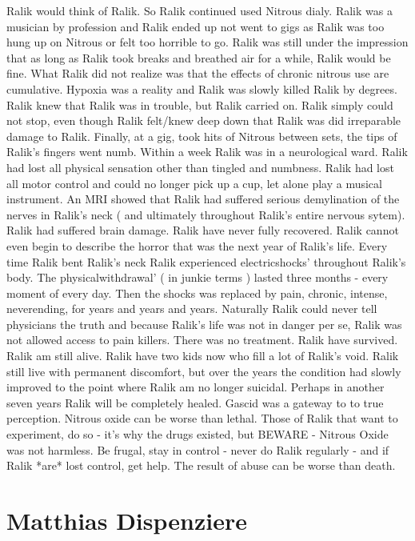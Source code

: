 \documentclass[12pt]{book}
\begin{document}
Ralik would think of Ralik. So Ralik continued used Nitrous dialy. Ralik was a musician by profession and Ralik ended up not went to gigs as Ralik was too hung up on Nitrous or felt too horrible to go. Ralik was still under the impression that as long as Ralik took breaks and breathed air for a while, Ralik would be fine. What Ralik did not realize was that the effects of chronic nitrous use are cumulative. Hypoxia was a reality and Ralik was slowly killed Ralik by degrees. Ralik knew that Ralik was in trouble, but Ralik carried on. Ralik simply could not stop, even though Ralik felt/knew deep down that Ralik was did irreparable damage to Ralik. Finally, at a gig, took hits of Nitrous between sets, the tips of Ralik's fingers went numb. Within a week Ralik was in a neurological ward. Ralik had lost all physical sensation other than tingled and numbness. Ralik had lost all motor control and could no longer pick up a cup, let alone play a musical instrument. An MRI showed that Ralik had suffered serious demylination of the nerves in Ralik's neck ( and ultimately throughout Ralik's entire nervous sytem). Ralik had suffered brain damage. Ralik have never fully recovered. Ralik cannot even begin to describe the horror that was the next year of Ralik's life. Every time Ralik bent Ralik's neck Ralik experienced electricshocks' throughout Ralik's body. The physicalwithdrawal' ( in junkie terms ) lasted three months - every moment of every day. Then the shocks was replaced by pain, chronic, intense, neverending, for years and years and years. Naturally Ralik could never tell physicians the truth and because Ralik's life was not in danger per se, Ralik was not allowed access to pain killers. There was no treatment. Ralik have survived. Ralik am still alive. Ralik have two kids now who fill a lot of Ralik's void. Ralik still live with permanent discomfort, but over the years the condition had slowly improved to the point where Ralik am no longer suicidal. Perhaps in another seven years Ralik will be completely healed. Gascid was a gateway to to true perception. Nitrous oxide can be worse than lethal. Those of Ralik that want to experiment, do so - it's why the drugs existed, but BEWARE - Nitrous Oxide was not harmless. Be frugal, stay in control - never do Ralik regularly - and if Ralik *are* lost control, get help. The result of abuse can be worse than death.



\chapter{Matthias Dispenziere}
\end{document}

